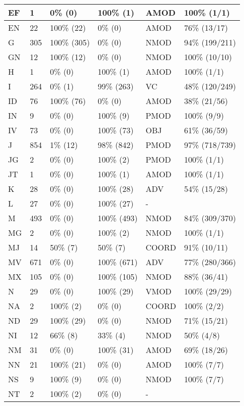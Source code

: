 \begin{figure*}
\begin{tabular}{|l|l|l|l||l|l|}
 EF & 1 & 0\% (0) & 100\% (1) & AMOD & 100\% (1/1) \\ 
\hline
 EN & 22 & 100\% (22) & 0\% (0) & AMOD & 76\% (13/17) \\ 
\hline
 G & 305 & 100\% (305) & 0\% (0) & NMOD & 94\% (199/211) \\ 
\hline
 GN & 12 & 100\% (12) & 0\% (0) & NMOD & 100\% (10/10) \\ 
\hline
 H & 1 & 0\% (0) & 100\% (1) & AMOD & 100\% (1/1) \\ 
\hline
 I & 264 & 0\% (1) & 99\% (263) & VC & 48\% (120/249) \\ 
\hline
 ID & 76 & 100\% (76) & 0\% (0) & AMOD & 38\% (21/56) \\ 
\hline
 IN & 9 & 0\% (0) & 100\% (9) & PMOD & 100\% (9/9) \\ 
\hline
 IV & 73 & 0\% (0) & 100\% (73) & OBJ & 61\% (36/59) \\ 
\hline
 J & 854 & 1\% (12) & 98\% (842) & PMOD & 97\% (718/739) \\ 
\hline
 JG & 2 & 0\% (0) & 100\% (2) & PMOD & 100\% (1/1) \\ 
\hline
 JT & 1 & 0\% (0) & 100\% (1) & AMOD & 100\% (1/1) \\ 
\hline
 K & 28 & 0\% (0) & 100\% (28) & ADV & 54\% (15/28) \\ 
\hline
 L & 27 & 0\% (0) & 100\% (27) & - &  \\ 
\hline
 M & 493 & 0\% (0) & 100\% (493) & NMOD & 84\% (309/370) \\ 
\hline
 MG & 2 & 0\% (0) & 100\% (2) & NMOD & 100\% (1/1) \\ 
\hline
 MJ & 14 & 50\% (7) & 50\% (7) & COORD & 91\% (10/11) \\ 
\hline
 MV & 671 & 0\% (0) & 100\% (671) & ADV & 77\% (280/366) \\ 
\hline
 MX & 105 & 0\% (0) & 100\% (105) & NMOD & 88\% (36/41) \\ 
\hline
 N & 29 & 0\% (0) & 100\% (29) & VMOD & 100\% (29/29) \\ 
\hline
 NA & 2 & 100\% (2) & 0\% (0) & COORD & 100\% (2/2) \\ 
\hline
 ND & 29 & 100\% (29) & 0\% (0) & NMOD & 71\% (15/21) \\ 
\hline
 NI & 12 & 66\% (8) & 33\% (4) & NMOD & 50\% (4/8) \\ 
\hline
 NM & 31 & 0\% (0) & 100\% (31) & AMOD & 69\% (18/26) \\ 
\hline
 NN & 21 & 100\% (21) & 0\% (0) & AMOD & 100\% (7/7) \\ 
\hline
 NS & 9 & 100\% (9) & 0\% (0) & NMOD & 100\% (7/7) \\ 
\hline
 NT & 2 & 100\% (2) & 0\% (0) & - &  \\ 
\hline
\end{tabular}
\end{figure*}

